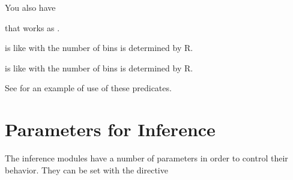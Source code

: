 \documentclass[letterpaper,10pt,english]{sphinxmanual}
\begin{document}
You also have

\begin{sphinxVerbatim}[commandchars=\\\{\}]
  
\end{sphinxVerbatim}

that works as .

\begin{sphinxVerbatim}[commandchars=\\\{\}]
  
\end{sphinxVerbatim}

is like  with the number of bins is determined by R.

\begin{sphinxVerbatim}[commandchars=\\\{\}]
  
\end{sphinxVerbatim}

is like  with the number of bins is determined by R.

See  for an example of use of these predicates.


\section{Parameters for Inference}
\label{\detokenize{index:parameters-for-inference}}
The inference modules have a number of parameters in order to control their behavior.
They can be set with the directive

\begin{sphinxVerbatim}[commandchars=\\\{\}]
 
\end{sphinxVerbatim}
\end{document}
